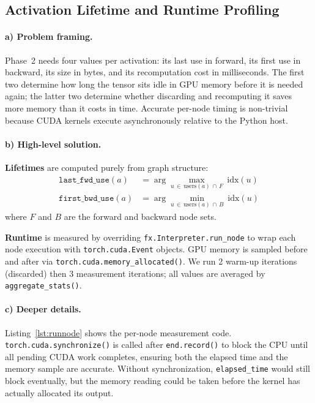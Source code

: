 \documentclass[11pt]{article}
\begin{document}
\subsection{Activation Lifetime and Runtime Profiling}

\paragraph{a) Problem framing.}
Phase~2 needs four values per activation: its last use in forward, its
first use in backward, its size in bytes, and its recomputation cost in
milliseconds.
The first two determine how long the tensor sits idle in GPU memory
before it is needed again; the latter two determine whether discarding
and recomputing it saves more memory than it costs in time.
Accurate per-node timing is non-trivial because CUDA kernels execute
asynchronously relative to the Python host.

\paragraph{b) High-level solution.}
\textbf{Lifetimes} are computed purely from graph structure:
\begin{align*}
  \texttt{last\_fwd\_use}(a)  &= \arg\max_{u \,\in\, \text{users}(a)\,\cap\, F}\ \text{idx}(u) \\
  \texttt{first\_bwd\_use}(a) &= \arg\min_{u \,\in\, \text{users}(a)\,\cap\, B}\ \text{idx}(u)
\end{align*}
where $F$ and $B$ are the forward and backward node sets.

\textbf{Runtime} is measured by overriding \texttt{fx.Interpreter.run\_node}
to wrap each node execution with \texttt{torch.cuda.Event} objects.
GPU memory is sampled before and after via
\texttt{torch.cuda.memory\_allocated()}.
We run 2 warm-up iterations (discarded) then 3 measurement iterations;
all values are averaged by \texttt{aggregate\_stats()}.

\paragraph{c) Deeper details.}
Listing~\ref{lst:runnode} shows the per-node measurement code.
\texttt{torch.cuda.synchronize()} is called after \texttt{end.record()}
to block the CPU until all pending CUDA work completes, ensuring both
the elapsed time and the memory sample are accurate.
Without synchronization, \texttt{elapsed\_time} would still block
eventually, but the memory reading could be taken before the kernel
has actually allocated its output.
\end{document}
